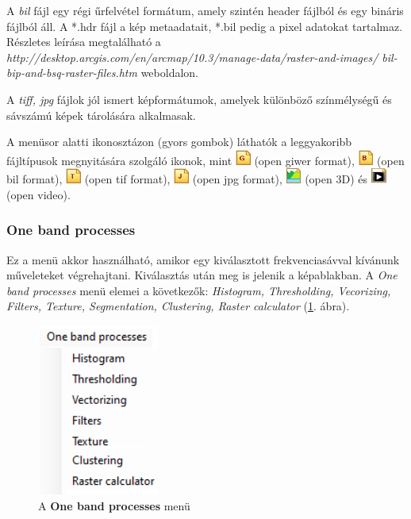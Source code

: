 \documentclass[a4paper,12pt]{article}
\begin{document}
A \textit{bil} fájl egy régi űrfelvétel formátum, amely szintén header fájlból és egy bináris fájlból áll. A *.hdr fájl a kép metaadatait, *.bil pedig a pixel adatokat tartalmaz. Részletes leírása megtalálható a \newline \textit{http://desktop.arcgis.com/en/arcmap/10.3/manage-data/raster-and-images/ bil-bip-and-bsq-raster-files.htm} weboldalon. 

A \textit{tiff, jpg} fájlok jól ismert képformátumok, amelyek különböző színmélységű és sávszámú képek tárolására alkalmasak.

A menüsor alatti ikonosztázon (gyors gombok) láthatók a leggyakoribb fájltípusok megnyitására szolgáló ikonok, mint \includegraphics[width=0.5cm]{opengiwer.png} (open giwer format), \includegraphics[width=0.5cm]{openbil.png} (open bil format), \includegraphics[width=0.5cm]{opentif.png} (open tif format), \includegraphics[width=0.5cm]{openjpg.png} (open jpg format), \includegraphics[width=0.5cm]{3d.png} (open 3D) és \includegraphics[width=0.5cm]{openvideo.png} (open video).


\subsubsection{One band processes}


Ez a menü akkor használható, amikor egy kiválasztott frekvenciasávval kívánunk műveleteket végrehajtani. Kiválasztás után meg is jelenik a képablakban. %
A \textit{One band processes} menü elemei a következők: \textit{Histogram, Thresholding, Vecorizing, Filters, Texture, Segmentation, Clustering, Raster calculator} (\ref{fig:onebandmenu}. ábra).

\begin{figure}
	\centering
	\includegraphics[width=4cm]{onebandmenu.png}
	\caption{A \textbf{One band processes} menü}
	\label{fig:onebandmenu}
\end{figure}
\end{document}
